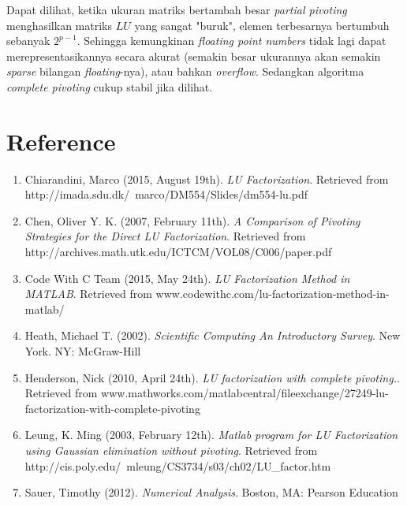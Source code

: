 \documentclass[11pt]{article}
\begin{document}
Dapat dilihat, ketika ukuran matriks bertambah besar \textit{partial pivoting} menghasilkan matriks $LU$ yang sangat "buruk", elemen terbesarnya bertumbuh sebanyak $2^{p-1}$. Sehingga kemungkinan \textit{floating point numbers} tidak lagi dapat merepresentasikannya secara akurat (semakin besar ukurannya akan semakin \textit{sparse} bilangan \textit{floating}-nya), atau bahkan \textit{overflow}. Sedangkan algoritma \textit{complete pivoting} cukup stabil jika dilihat.

\section{Reference}

\begin{enumerate}

    \item Chiarandini, Marco (2015, August 19th). \textit{LU Factorization}. 
    Retrieved from \\http://imada.sdu.dk/~marco/DM554/Slides/dm554-lu.pdf
    
    \item Chen, Oliver Y. K. (2007, February 11th). \textit{A Comparison of Pivoting Strategies for the Direct LU Factorization}. Retrieved from http://archives.math.utk.edu/ICTCM/VOL08/C006/paper.pdf
    
    \item Code With C Team (2015, May 24th). \textit{LU Factorization Method in MATLAB}. Retrieved from www.codewithc.com/lu-factorization-method-in-matlab/
    
    \item Heath, Michael T. (2002). \textit{Scientific Computing An Introductory Survey}. New York. NY: McGraw-Hill
    
    \item Henderson, Nick (2010, April 24th). \textit{LU factorization with complete pivoting.}. Retrieved from www.mathworks.com/matlabcentral/fileexchange/27249-lu-factorization-with-complete-pivoting
    
    \item Leung, K. Ming (2003, February 12th). \textit{Matlab program for LU Factorization using Gaussian elimination without pivoting}. Retrieved from http://cis.poly.edu/~mleung/CS3734/s03/ch02/LU\_factor.htm
    
    \item Sauer, Timothy (2012). \textit{Numerical Analysis}. Boston, MA: Pearson Education
    
\end{enumerate}
\end{document}

